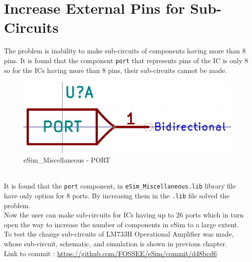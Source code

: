 \documentclass[12pt,a4paper]{report}
\begin{document}
\section{Increase External Pins for Sub-Circuits}
The problem is inability to make sub-circuits of components having more than 8 pins. It is found that the component \texttt{port} that represents pins of the IC is only 8 so for the ICs having more than 8 pins, their sub-circuits cannot be made.
\begin{figure}[h]
	\centering
	\includegraphics[scale=0.3]{port}
	\caption{eSim\_Miscellaneous - PORT}
\end{figure} 
\\
It is found that the \texttt{port} component, in \texttt{eSim\_Miscellaneous.lib} library file have only option for 8 ports. By increasing them in the \texttt{.lib} file solved the problem.
\\
Now the user can make sub-circuits for ICs having up to 26 ports which in turn open the way to increase the number of components in eSim to a large extent.
\\
To test the change sub-circuits of LM733H Operational Amplifier was made, whose
sub-circuit, schematic, and simulation is shown in previous chapter.
\vspace{3mm}
\\
Link to commit : \url{https://github.com/FOSSEE/eSim/commit/d48bcd6}
\\
\end{document}
